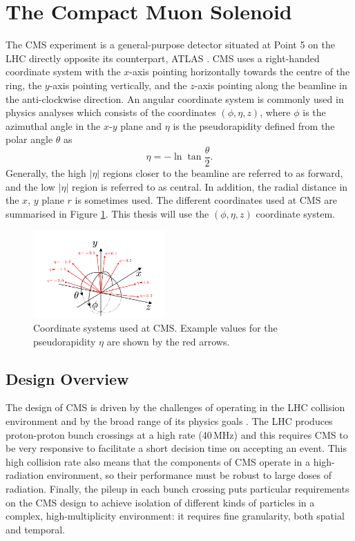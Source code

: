 \section{The Compact Muon Solenoid}

The CMS experiment \cite{CMSatLHC} is a general-purpose detector situated at Point 5 on the LHC directly opposite its counterpart, ATLAS \cite{AtlasatLHC}. CMS uses a right-handed coordinate system with the $x$-axis pointing horizontally towards the centre of the ring, the $y$-axis pointing vertically, and the $z$-axis pointing along the beamline in the anti-clockwise direction. 
An angular coordinate system is commonly used in physics analyses which consists of the coordinates $(\phi,\eta,z)$, where $\phi$ is the azimuthal angle in the $x$-$y$ plane and $\eta$ is the pseudorapidity defined from the polar angle $\theta$ as
\begin{equation}
    \label{eq:apparatus:pseudorapidity}
    \eta = -\ln\tan{\frac{\theta}{2}}.
\end{equation}
Generally, the high $|\eta|$ regions closer to the beamline are referred to as forward, and the low $|\eta|$ region is referred to as central. 
In addition, the radial distance in the $x$, $y$ plane $r$ is sometimes used. The different coordinates used at CMS are summarised in Figure \ref{fig:apparatus:coords}. This thesis will use the $(\phi,\eta,z)$ coordinate system. 
\begin{figure}[h!]
    \centering
    \includegraphics[width=0.45\textwidth]{figures/apparatus/CMS_coords.pdf}
    \caption{Coordinate systems used at CMS. Example values for the pseudorapidity $\eta$ are shown by the red arrows.}
    \label{fig:apparatus:coords}
\end{figure}

\subsection{Design Overview}
The design of CMS is driven by the challenges of operating in the LHC collision environment and by the broad range of its physics goals \cite{CMSPhysics}.
The LHC produces proton-proton bunch crossings at a high rate (40\,MHz) and this requires CMS to be very responsive to facilitate a short decision time on accepting an event. This high collision rate also means that the components of CMS operate in a high-radiation environment, so their performance must be robust to large doses of radiation. Finally, the pileup in each bunch crossing puts particular requirements on the CMS design to achieve isolation of different kinds of particles in a complex, high-multiplicity environment: it requires fine granularity, both spatial and temporal. 



